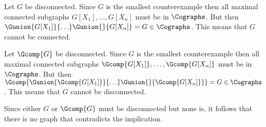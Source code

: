 Let $G$ be disconnected. Since $G$ is the smallest counterexample then all maximal connected subgraphs $G[X_1], \ldots, G[X_n]$ must be in $\Cographs$. But then $\Gunion{G[X_1]}{\ldots} \Gunion{}{G[X_n]} = G \in \Cographs$. This means that $G$ cannot be connected.

Let $\Gcomp{G}$ be disconnected. Since $G$ is the smallest counterexample then all maximal connected subgraphs $\Gcomp{G[X_1]}, \ldots, \Gcomp{G[X_n]}$ must be in $\Cographs$. But then $\Gcomp{\Gunion{\Gcomp{G[X_1]}}{\ldots} \Gunion{}{\Gcomp{G[X_n]}}} = G \in \Cographs$. This means that $G$ cannot be disconnected.

Since either $G$ or $\Gcomp{G}$ must be disconnected but none is, it follows that there is no graph that contradicts the implication.
